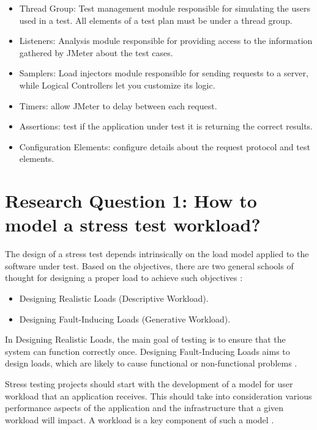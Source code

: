 \documentclass[espaco=umemeio,chapter=TITLE,twoside,openright]{abnt}
\begin{document}
\begin{itemize}
\item Thread Group: Test management module responsible for simulating the users used in a test. All elements of a test plan must be under a thread group.
\item Listeners: Analysis module responsible for providing access to the information gathered by JMeter about the test cases.
\item Samplers: Load injectors module responsible for sending requests to a server, while Logical Controllers let you customize its logic.
\item Timers: allow JMeter to delay between each request.
\item Assertions: test if the application under test it is returning the correct results.
\item Configuration Elements: configure details about the request protocol and test elements.
\end{itemize}



\FloatBarrier

\section{Research Question 1: How to  model a stress test workload?}


The design of a stress test depends intrinsically on the load model applied to the software under test. Based on the objectives, there are two general schools of thought for designing a proper load to achieve such objectives \cite{Afzal2009a}:

\begin{itemize}
\item Designing Realistic Loads (Descriptive Workload).
\item Designing Fault-Inducing Loads (Generative Workload).
\end{itemize}

In Designing Realistic Loads, the main goal of testing is to ensure that the system can function correctly once. Designing Fault-Inducing Loads aims to design loads, which are likely to cause functional or non-functional problems \cite{Afzal2009a}.

Stress testing projects should start with the development of a model for user workload that an application receives. This should take into consideration various performance aspects of the application and the infrastructure that a given workload will impact. A workload is a key component of such a model \cite{Molyneaux2009}.
\end{document}

